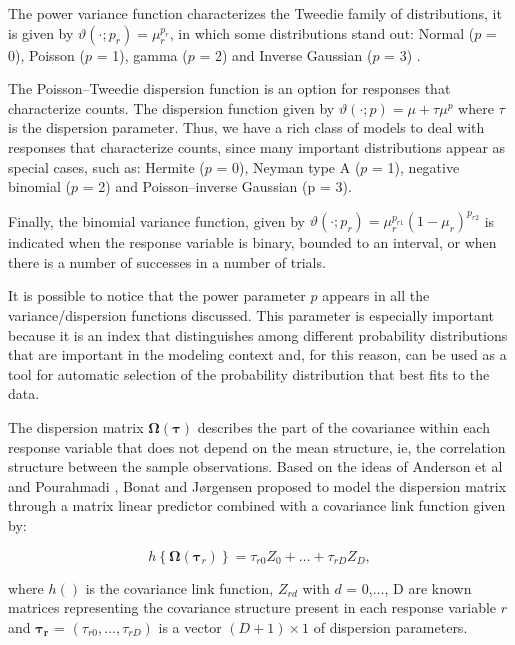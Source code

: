 \documentclass[USenglish]{article}
\theoremstyle{dgthm}
\theoremstyle{dgdef}
\begin{document}
The power variance function characterizes the Tweedie family of distributions, it is given by $\vartheta\left(\cdot; p_r\right) = \mu^{p_r}_r$, in which some distributions stand out: Normal ($p $ = 0), Poisson ($p$ = 1), gamma ($p$ = 2) and Inverse Gaussian ($p$ = 3) \cite{Jorgensen87, Jorgensen97}. 

The Poisson–Tweedie dispersion function \cite{Jorgensen15} is an option for responses that characterize counts. The dispersion function given by $\vartheta\left(\cdot; p\right) = \mu + \tau\mu^p$ where $\tau$ is the dispersion parameter. Thus, we have a rich class of models to deal with responses that characterize counts, since many important distributions appear as special cases, such as: Hermite ($p$ = 0), Neyman type A ($p$ = 1), negative binomial ($p$ = 2) and Poisson–inverse Gaussian (p = $3$).

Finally, the binomial variance function, given by $\vartheta\left(\cdot; p_r\right) = \mu^{p_{r1}}_r(1 - \mu_r)^{p_{r2}}$ is indicated when the response variable is binary, bounded to an interval, or when there is a number of successes in a number of trials.

It is possible to notice that the power parameter $p$ appears in all the variance/dispersion functions discussed. This parameter is especially important because it is an index that distinguishes among different probability distributions that are important in the modeling context and, for this reason, can be used as a tool for automatic selection of the probability distribution that best fits to the data.

The dispersion matrix $\boldsymbol{\Omega({\tau})}$ describes the part of the covariance within each response variable that does not depend on the mean structure, ie, the correlation structure between the sample observations. Based on the ideas of Anderson et al \cite{Anderson73} and Pourahmadi \cite{Pourahmadi00}, Bonat and Jørgensen \cite{Bonat16} proposed to model the dispersion matrix through a matrix linear predictor combined with a covariance link function given by:

$$
h\left \{ \boldsymbol{\Omega}(\boldsymbol{\tau}_r) \right \} = \tau_{r0}Z_0 + \ldots + \tau_{rD}Z_D,
$$

\noindent where $h()$ is the covariance link function, $Z_{rd}$ with $d$ = 0,$\ldots$, D are known matrices representing the covariance structure present in each response variable $r$ and $\boldsymbol{\tau_r}$ = $(\tau_{r0}, \ldots, \tau_{rD})$ is a vector $(D + 1) \times 1$ of dispersion parameters.
\end{document}
